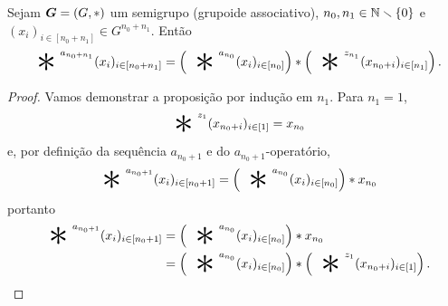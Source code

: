 \begin{proposition}
\label{prop:lema.associatividade.generalizada}
Sejam $\bm G=(G,\ast)$ um semigrupo (grupoide associativo), $n_0,n_1 \in \mathbb{N} \smallsetminus \{0\}$ e $(x_i)_{i \in [n_0+n_1]} \in G^{n_0+n_1}$. Então
	\begin{equation*}
	\bigopb\nolimits^{a_{n_0+n_1}} (x_i)_{i \in [n_0+n_1]} = \left( \bigopb\nolimits^{a_{n_0}} (x_i)_{i \in [n_0]} \right) \opb \left( \bigopb\nolimits^{z_{n_1}} (x_{n_0+i})_{i \in [n_1]} \right).
	\end{equation*}
\end{proposition}
\begin{proof}
Vamos demonstrar a proposição por indução em $n_1$. Para $n_1=1$,
	\begin{equation*}
	\bigopb\nolimits^{z_{1}} (x_{n_0+i})_{i \in [1]} = x_{n_0}
	\end{equation*}
e, por definição da sequência $a_{n_0+1}$ e do $a_{n_0+1}$-operatório,
	\begin{equation*}
	\bigopb\nolimits^{a_{n_0+1}} (x_i)_{i \in [n_0+1]} = \left( \bigopb\nolimits^{a_{n_0}} (x_i)_{i \in [n_0]} \right) \opb x_{n_0}
	\end{equation*}
portanto
	\begin{align*}
	\bigopb\nolimits^{a_{n_0+1}} (x_i)_{i \in [n_0+1]} &= \left( \bigopb\nolimits^{a_{n_0}} (x_i)_{i \in [n_0]} \right) \opb x_{n_0} \\
		&= \left( \bigopb\nolimits^{a_{n_0}} (x_i)_{i \in [n_0]} \right) \opb \left( \bigopb\nolimits^{z_{1}} (x_{n_0+i})_{i \in [1]} \right).
	\end{align*}


\end{proof}
